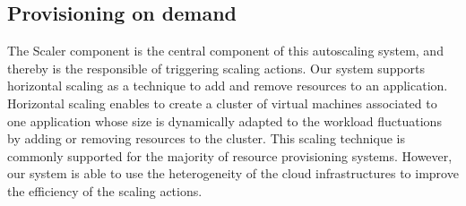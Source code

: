 \subsection{Provisioning on demand}
The Scaler component is the central component of this autoscaling system, and thereby is the responsible of triggering scaling actions. Our system supports horizontal scaling as a technique to add and remove resources to an application. Horizontal scaling enables to create a cluster of virtual machines associated to one application whose size is dynamically adapted to the workload fluctuations by adding or removing resources to the cluster. This scaling technique is commonly supported for the majority of resource provisioning systems. However, our system is able to use the heterogeneity of the cloud infrastructures to improve the efficiency of the scaling actions.


